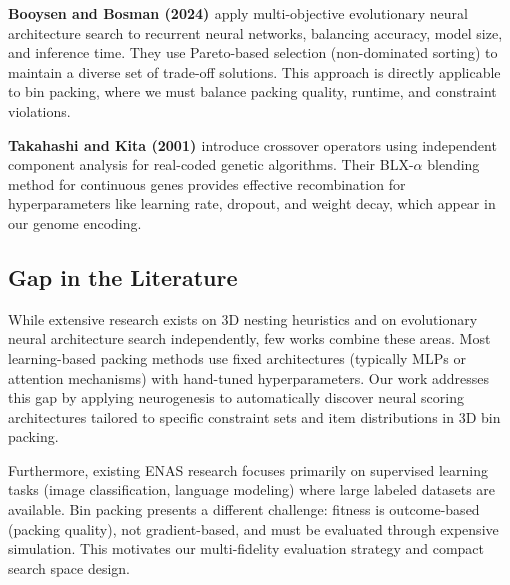 \textbf{Booysen and Bosman (2024) \cite{BB24}} apply multi-objective evolutionary neural architecture search to recurrent neural networks, balancing accuracy, model size, and inference time. They use Pareto-based selection (non-dominated sorting) to maintain a diverse set of trade-off solutions. This approach is directly applicable to bin packing, where we must balance packing quality, runtime, and constraint violations.

\textbf{Takahashi and Kita (2001) \cite{TK01}} introduce crossover operators using independent component analysis for real-coded genetic algorithms. Their BLX-$\alpha$ blending method for continuous genes provides effective recombination for hyperparameters like learning rate, dropout, and weight decay, which appear in our genome encoding.

\subsection{Gap in the Literature}

While extensive research exists on 3D nesting heuristics and on evolutionary neural architecture search independently, few works combine these areas. Most learning-based packing methods use fixed architectures (typically MLPs or attention mechanisms) with hand-tuned hyperparameters. Our work addresses this gap by applying neurogenesis to automatically discover neural scoring architectures tailored to specific constraint sets and item distributions in 3D bin packing.

Furthermore, existing ENAS research focuses primarily on supervised learning tasks (image classification, language modeling) where large labeled datasets are available. Bin packing presents a different challenge: fitness is outcome-based (packing quality), not gradient-based, and must be evaluated through expensive simulation. This motivates our multi-fidelity evaluation strategy and compact search space design.
